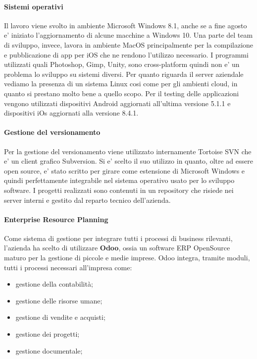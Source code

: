 \paragraph{Sistemi operativi}
Il lavoro viene svolto in ambiente Microsoft Windows 8.1, anche se a fine agosto e' iniziato l'aggiornamento di alcune macchine a Windows 10. Una parte del team di sviluppo, invece, lavora in ambiente MacOS principalmente per la compilazione e pubblicazione di app per iOS che ne rendono l'utilizzo necessario. I programmi utilizzati quali Photoshop, Gimp, Unity, sono cross-platform quindi non e' un problema lo sviluppo su sistemi diversi. 
Per quanto riguarda il server aziendale vediamo la presenza di un sistema Linux cosi come per gli ambienti cloud, in quanto si prestano molto bene a quello scopo.
Per il testing delle applicazioni vengono utilizzati dispositivi Android aggiornati all'ultima versione 5.1.1 e dispositivi iOs aggiornati alla versione 8.4.1.

\paragraph{Gestione del versionamento}
Per la gestione del versionamento viene utilizzato internamente Tortoise SVN che e' un client grafico Subversion. Si e' scelto il suo utilizzo in quanto, oltre ad essere open source, e' stato scritto per girare come estensione di Microsoft Windows e quindi perfettamente integrabile nel sistema operativo usato per lo sviluppo software.
I progetti realizzati sono contenuti in un repository che risiede nei server interni e gestito dal reparto tecnico dell'azienda.

\paragraph{Enterprise Resource Planning}
Come sistema di gestione per integrare tutti i processi di business rilevanti, l'azienda ha scelto di utilizzare \textbf{Odoo}, ossia un software ERP OpenSource maturo per la gestione di piccole e medie imprese. 
Odoo integra, tramite moduli, tutti i processi necessari all'impresa come:
\begin{itemize}
	\item gestione della contabilità;
	\item gestione delle risorse umane;
	\item gestione di vendite e acquisti;
	\item gestione dei progetti;
	\item gestione documentale;
\end{itemize}

